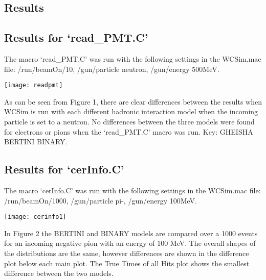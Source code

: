 \documentclass[a0,portrait]{a0poster}
\begin{document}
\begin{multicols}{2}
\color{DarkOrchid4}
\section*{Results}
\subsection*{Results for `read\_PMT.C'}
The macro `read\_PMT.C' was run with the following settings in the WCSim.mac file: /run/beamOn/10, /gun/particle neutron, /gun/energy 500MeV.

\begin{center}\vspace{0cm}
	\texttt{[image: readpmt]}
\end{center}\vspace{0cm}

As can be seen from Figure 1, there are clear differences between the results when WCSim is run with each different hadronic interaction model when the incoming particle is set to a neutron. No differences between the three models were found for electrons or pions when the `read\_PMT.C' macro was run. Key: \textcolor{Red1}{GHEISHA} \textcolor{Green1}{BERTINI} \textcolor{Blue1}{BINARY}. 

\color{Maroon0}
\subsection*{Results for `cerInfo.C'}
The macro `cerInfo.C' was run with the following settings in the WCSim.mac file: /run/beamOn/1000, /gun/particle pi-, /gun/energy 100MeV.
\begin{center}\vspace{0cm}
	\texttt{[image: cerinfo1]}
\end{center}\vspace{0cm}

In Figure 2 the \textcolor{Red1}{BERTINI} and \textcolor{Blue1}{BINARY} models are compared over a 1000 events for an incoming negative pion with an energy of 100 MeV. The overall shapes of the distributions are the same, however differences are shown in the difference plot below each main plot. The True Times of all Hits plot shows the smallest difference between the two models.\\


\end{multicols}
\end{document}

